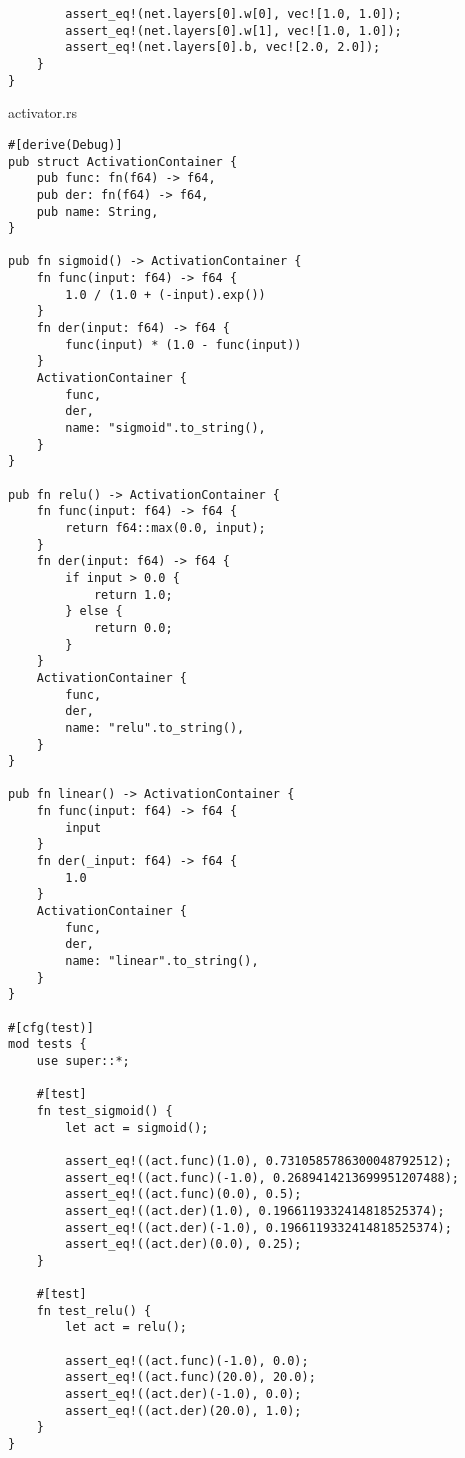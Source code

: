 \begin{code}
\begin{verbatim}
        assert_eq!(net.layers[0].w[0], vec![1.0, 1.0]);
        assert_eq!(net.layers[0].w[1], vec![1.0, 1.0]);
        assert_eq!(net.layers[0].b, vec![2.0, 2.0]);
    }
}

\end{verbatim}
\end{code}

\begin{code}
\caption{activator.rs}
\begin{verbatim}  
#[derive(Debug)]
pub struct ActivationContainer {
    pub func: fn(f64) -> f64,
    pub der: fn(f64) -> f64,
    pub name: String,
}

pub fn sigmoid() -> ActivationContainer {
    fn func(input: f64) -> f64 {
        1.0 / (1.0 + (-input).exp())
    }
    fn der(input: f64) -> f64 {
        func(input) * (1.0 - func(input))
    }
    ActivationContainer {
        func,
        der,
        name: "sigmoid".to_string(),
    }
}

pub fn relu() -> ActivationContainer {
    fn func(input: f64) -> f64 {
        return f64::max(0.0, input);
    }
    fn der(input: f64) -> f64 {
        if input > 0.0 {
            return 1.0;
        } else {
            return 0.0;
        }
    }
    ActivationContainer {
        func,
        der,
        name: "relu".to_string(),
    }
}

pub fn linear() -> ActivationContainer {
    fn func(input: f64) -> f64 {
        input
    }
    fn der(_input: f64) -> f64 {
        1.0
    }
    ActivationContainer {
        func,
        der,
        name: "linear".to_string(),
    }
}

#[cfg(test)]
mod tests {
    use super::*;

    #[test]
    fn test_sigmoid() {
        let act = sigmoid();

        assert_eq!((act.func)(1.0), 0.7310585786300048792512);
        assert_eq!((act.func)(-1.0), 0.2689414213699951207488);
        assert_eq!((act.func)(0.0), 0.5);
        assert_eq!((act.der)(1.0), 0.1966119332414818525374);
        assert_eq!((act.der)(-1.0), 0.1966119332414818525374);
        assert_eq!((act.der)(0.0), 0.25);
    }

    #[test]
    fn test_relu() {
        let act = relu();

        assert_eq!((act.func)(-1.0), 0.0);
        assert_eq!((act.func)(20.0), 20.0);
        assert_eq!((act.der)(-1.0), 0.0);
        assert_eq!((act.der)(20.0), 1.0);
    }
}

\end{verbatim}
\end{code}


